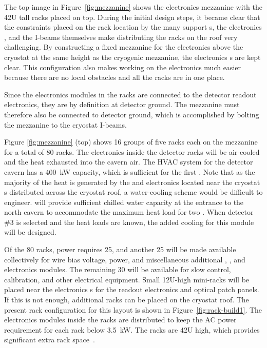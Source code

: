 The top image in Figure~\ref{fig:mezzanine} shows the  electronics mezzanine with the 42U tall racks placed on top. 
During the initial design steps, it became clear that the constraints placed on the rack location by the many  support \fdth{}s, the electronics \fdth, and the I-beams themselves make distributing the racks on the roof very challenging. 
By constructing a fixed mezzanine for the electronics above the cryostat at the same height as the cryogenic mezzanine, the electronics \fdth{}s are kept clear. 
This configuration also makes working on the electronics much easier because there are no local obstacles and all the racks are in one place.

Since the electronics modules in the  racks are connected to the detector readout electronics, they are by definition at detector ground. The mezzanine must therefore also be connected to detector ground, which is accomplished by bolting the mezzanine to the cryostat I-beams. 
 
Figure \ref{fig:mezzanine} (top) shows 16 groups of five racks each
on the mezzanine for a total of 80 racks. 
The electronics inside the detector racks will be air-cooled and the heat exhausted into the cavern air. The HVAC system for the detector cavern has a \SI{400}{kW} capacity, which is sufficient for the first .  Note that as the majority of the heat is generated by the   and  electronics located near the cryostat \fdth{}s distributed across the cryostat roof, a water-cooling scheme would be difficult to engineer.
  will provide sufficient chilled water capacity at the entrance to the north cavern to accommodate the maximum heat load for two . When detector \#3 is selected and the heat loads are known, the added cooling for this module will be designed.



Of the 80 racks,   power requires \num{25}, and another \num{25} will be made available collectively for   wire bias voltage,  power, and miscellaneous additional ,  , and   electronics modules. 
The remaining 30 will be available for slow control, calibration, and other electrical equipment. 
Small 12U-high mini-racks will  be placed near the electronics \fdth{}s for the  readout electronics and optical patch panels. If this is not enough, additional racks can be placed on the cryostat roof. The present rack configuration for this layout is shown in Figure~\ref{fig:rack-build1}. 
The electronics modules inside the racks are distributed to keep the AC power requirement for each rack below \SI{3.5}{kW}. 
The racks are 42U high, which provides significant extra rack space~\cite{bib:docdb4499}.  


